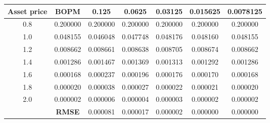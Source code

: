 \begin{table}[H]
    \begin{tabular}{@{}ccccccc@{}}
        \toprule
        \textbf{Asset price} & \textbf{BOPM} & 0.125    & 0.0625   & 0.03125  & 0.015625 & 0.0078125 \\ \midrule
        0.8                  & 0.200000      & 0.200000 & 0.200000 & 0.200000 & 0.200000 & 0.200000  \\
        1.0                  & 0.048155      & 0.046048 & 0.047748 & 0.048176 & 0.048160 & 0.048155  \\
        1.2                  & 0.008662      & 0.008661 & 0.008638 & 0.008705 & 0.008674 & 0.008662  \\
        1.4                  & 0.001286      & 0.001467 & 0.001369 & 0.001313 & 0.001292 & 0.001286  \\
        1.6                  & 0.000168      & 0.000237 & 0.000196 & 0.000176 & 0.000170 & 0.000168  \\
        1.8                  & 0.000020      & 0.000038 & 0.000027 & 0.000022 & 0.000021 & 0.000020  \\
        2.0                  & 0.000002      & 0.000006 & 0.000004 & 0.000003 & 0.000002 & 0.000002  \\
                             & \textbf{RMSE} & 0.000081 & 0.000017 & 0.000002 & 0.000000 & 0.000000  \\ \bottomrule
    \end{tabular}
\end{table}

